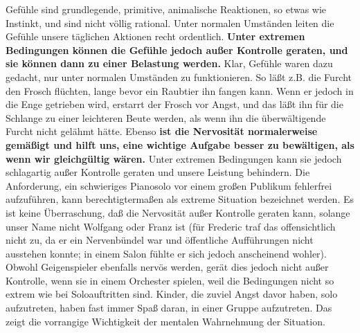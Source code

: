 Gefühle sind grundlegende, primitive, animalische Reaktionen, so etwas wie Instinkt, und sind nicht völlig rational.
Unter normalen Umständen leiten die Gefühle unsere täglichen Aktionen recht ordentlich.
\textbf{Unter extremen Bedingungen können die Gefühle jedoch außer Kontrolle geraten, und sie können dann zu einer Belastung werden.}
Klar, Gefühle waren dazu gedacht, nur unter normalen Umständen zu funktionieren.
So läßt z.B. die Furcht den Frosch flüchten, lange bevor ein Raubtier ihn fangen kann.
Wenn er jedoch in die Enge getrieben wird, erstarrt der Frosch vor Angst, und das läßt ihn für die Schlange zu einer leichteren Beute werden, als wenn ihn die überwältigende Furcht nicht gelähmt hätte.
Ebenso \textbf{ist die Nervosität normalerweise gemäßigt und hilft uns, eine wichtige Aufgabe besser zu bewältigen, als wenn wir gleichgültig wären.}
Unter extremen Bedingungen kann sie jedoch schlagartig außer Kontrolle geraten und unsere Leistung behindern.
Die Anforderung, ein schwieriges Pianosolo vor einem großen Publikum fehlerfrei aufzuführen, kann berechtigtermaßen als extreme Situation bezeichnet werden.
Es ist keine Überraschung, daß die Nervosität außer Kontrolle geraten kann, solange unser Name nicht Wolfgang oder Franz ist (für Frederic traf das offensichtlich nicht zu, da er ein Nervenbündel war und öffentliche Aufführungen nicht ausstehen konnte; in einem Salon fühlte er sich jedoch anscheinend wohler).
Obwohl Geigenspieler ebenfalls nervös werden, gerät dies jedoch nicht außer Kontrolle, wenn sie in einem Orchester spielen, weil die Bedingungen nicht so extrem wie bei Soloauftritten sind.
Kinder, die zuviel Angst davor haben, solo aufzutreten, haben fast immer Spaß daran, in einer Gruppe aufzutreten.
Das zeigt die vorrangige Wichtigkeit der mentalen Wahrnehmung der Situation.


